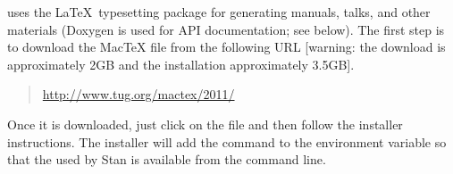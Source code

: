 \CmdStan uses the \LaTeX\ typesetting package for generating manuals,
talks, and other materials (Doxygen is used for API documentation; see
below).  The first step is to download the MacTeX  file
from the following URL [warning: the download is approximately 2GB and
the installation approximately 3.5GB].
%
\begin{quote}
\url{http://www.tug.org/mactex/2011/}
\end{quote}
%
Once it is downloaded, just click on the  file and then
follow the installer instructions.  The installer will add the command
to the  environment variable so that the 
used by Stan is available from the command line.



